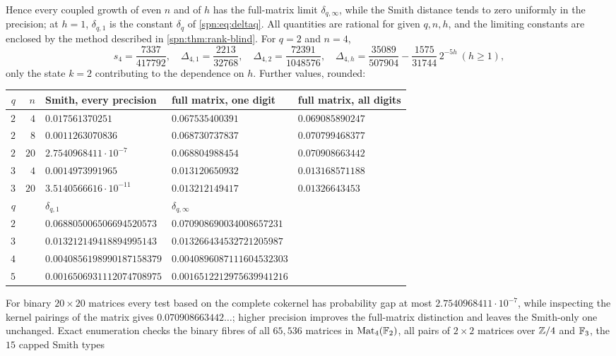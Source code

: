 Hence every coupled growth of even $n$ and of $h$ has the full-matrix limit $\delta_{q,\infty}$, while
the Smith distance tends to zero uniformly in the precision; at $h=1$, $\delta_{q,1}$ is the constant
$\delta_q$ of \eqref{spn:eq:deltaq}. All quantities are rational for given $q,n,h$, and the limiting
constants are enclosed by the method described in \cref{spn:thm:rank-blind}. For $q=2$ and $n=4$,
\[
 s_4=\frac{7337}{417792},\quad \Delta_{4,1}=\frac{2213}{32768},\quad\Delta_{4,2}=\frac{72391}{1048576},\quad
 \Delta_{4,h}=\frac{35089}{507904}-\frac{1575}{31744}\,2^{-5h}\ (h\ge1),
\]
only the state $k=2$ contributing to the dependence on $h$. Further values, rounded:
\begin{center}\small
\begin{tabular}{rrlll}
\toprule
$q$ & $n$ & Smith, every precision & full matrix, one digit & full matrix, all digits\\
\midrule
$2$ & $4$ & $0.017561370251$ & $0.067535400391$ & $0.069085890247$\\
$2$ & $8$ & $0.0011263070836$ & $0.068730737837$ & $0.070799468377$\\
$2$ & $20$ & $2.7540968411\cdot10^{-7}$ & $0.068804988454$ & $0.070908663442$\\
$3$ & $4$ & $0.0014973991965$ & $0.013120650932$ & $0.013168571188$\\
$3$ & $20$ & $3.5140566616\cdot10^{-11}$ & $0.013212149417$ & $0.01326643453$\\
\midrule
$q$ & & $\delta_{q,1}$ & $\delta_{q,\infty}$ &\\
\midrule
$2$ & & $0.068805006506694520573$ & $0.070908690034008657231$ &\\
$3$ & & $0.013212149418894995143$ & $0.013266434532721205987$ &\\
$4$ & & $0.0040856198990187158379$ & $0.0040896087111604532303$ &\\
$5$ & & $0.0016506931112074708975$ & $0.0016512212975639941216$ &\\
\bottomrule
\end{tabular}
\end{center}
For binary $20\times20$ matrices every test based on the complete cokernel has probability gap at most
$2.7540968411\cdot10^{-7}$, while inspecting the kernel pairings of the matrix gives
$0.070908663442\ldots$; higher precision improves the full-matrix distinction and leaves the
Smith-only one unchanged. Exact enumeration checks the binary fibres of all $65{,}536$ matrices in
$\operatorname{Mat}_4(\mathbb{F}_2)$, all pairs of $2\times2$ matrices over $\mathbb{Z}/4$ and $\mathbb{F}_3$, the $15$ capped Smith types
